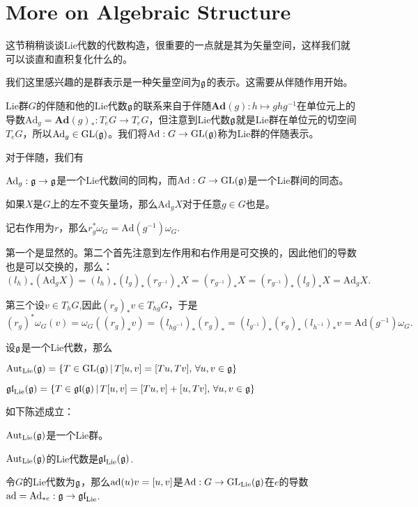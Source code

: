 \section{More on Algebraic Structure}
这节稍稍谈谈Lie代数的代数构造，很重要的一点就是其为矢量空间，这样我们就可以谈直和直积复化什么的。

我们这里感兴趣的是群表示是一种矢量空间为${\mathfrak{g}}$的表示。这需要从伴随作用开始。

Lie群$G$的伴随和他的Lie代数${\mathfrak{g}}$的联系来自于伴随$\mathbf{Ad}(g):h\mapsto ghg^{-1}$在单位元上的导数$\mathrm{Ad}_g=\mathbf{Ad}(g)_*:T_eG\to T_eG$，但注意到Lie代数${\mathfrak{g}}$就是Lie群在单位元的切空间$T_eG$，所以$\mathrm{Ad}_g\in \mathrm{GL}({\mathfrak{g}})$。我们将$\mathrm{Ad}:G\to \mathrm{GL}({\mathfrak{g}})$称为Lie群的伴随表示。


\pro 对于伴随，我们有

 $\mathrm{Ad}_g:{\mathfrak{g}}\to {\mathfrak{g}}$是一个Lie代数间的同构，而$\mathrm{Ad}:G\to \mathrm{GL}({\mathfrak{g}})$是一个Lie群间的同态。

 如果$X$是$G$上的左不变矢量场，那么$\mathrm{Ad}_gX$对于任意$g\in G$也是。

 记右作用为$r$，那么$r_g^*\omega_G=\mathrm{Ad}(g^{-1})\omega_G$.


第一个是显然的。第二个首先注意到左作用和右作用是可交换的，因此他们的导数也是可以交换的，那么：
\[
	(l_h)_*(\mathrm{Ad}_gX)=(l_h)_*(l_g)_*(r_{g^{-1}})_*X=(r_{g^{-1}})_*X=(r_{g^{-1}})_*(l_g)_*X=\mathrm{Ad}_gX.
\]

第三个设$v\in T_hG$,因此$(r_g)_*v\in T_{hg}G$，于是
\[
	(r_g)^*\omega_G(v)=\omega_G((r_g)_*v)=(l_{{hg}^{-1}})_*(r_g)_*
	=(l_{{g}^{-1}})_*(r_g)_*(l_{{h}^{-1}})_*v=\mathrm{Ad}(g^{-1})\omega_G.
\]


\para
设${\mathfrak{g}}$是一个Lie代数，那么

 $\mathrm{Aut}_{\mathrm{Lie}}({\mathfrak{g}})=\{T\in \mathrm{GL}({\mathfrak{g}})\,|\,T[u,v]=[Tu,Tv],\,\forall u,v\in{\mathfrak{g}}\}$

 $\mathfrak{gl}_{\mathrm{Lie}}({\mathfrak{g}})=\{T\in \mathfrak{gl}({\mathfrak{g}})\,|\,T[u,v]=[Tu,v]+[u,Tv],\,\forall u,v\in{\mathfrak{g}}\}$



\pro 如下陈述成立：

 $\mathrm{Aut}_{\mathrm{Lie}}({\mathfrak{g}})$是一个Lie群。

 $\mathrm{Aut}_{\mathrm{Lie}}({\mathfrak{g}})$的Lie代数是$\mathfrak{gl}_{\mathrm{Lie}}({\mathfrak{g}})$.

 令$G$的Lie代数为${\mathfrak{g}}$，那么${\mathrm{ad}}(u)v=[u,v]$是$\mathrm{Ad}:G\to \mathrm{GL}_{\mathrm{Lie}}({\mathfrak{g}})$在$e$的导数${\mathrm{ad}}=\mathrm{Ad}_{*e}:{\mathfrak{g}}\to \mathfrak{gl}_{\mathrm{Lie}}$.


